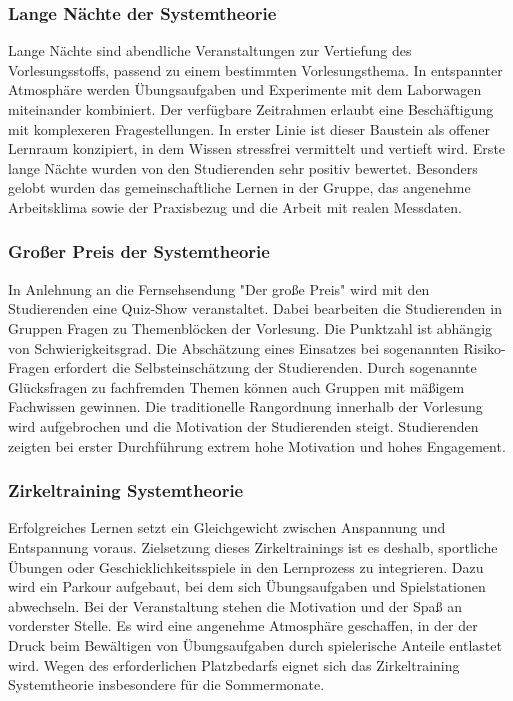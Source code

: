 \subsubsection{Lange Nächte der Systemtheorie}\label{sec:lange-nuxe4chte-der-systemtheorie}

Lange Nächte sind abendliche Veranstaltungen zur Vertiefung des Vorlesungsstoffs, passend zu einem bestimmten Vorlesungsthema. In entspannter Atmosphäre werden Übungsaufgaben und Experimente mit dem Laborwagen miteinander kombiniert. Der verfügbare Zeitrahmen erlaubt eine Beschäftigung mit komplexeren Fragestellungen. In erster Linie ist dieser Baustein als offener Lernraum konzipiert, in dem Wissen stressfrei vermittelt und vertieft wird. Erste lange Nächte wurden von den Studierenden sehr positiv bewertet. Besonders gelobt wurden das gemeinschaftliche Lernen in der Gruppe, das angenehme Arbeitsklima sowie der Praxisbezug und die Arbeit mit realen Messdaten.

\subsubsection{Großer Preis der Systemtheorie}\label{sec:grouxdfer-preis-der-systemtheorie}

In Anlehnung an die Fernsehsendung "Der große Preis" wird mit den Studierenden eine Quiz-Show veranstaltet. Dabei bearbeiten die Studierenden in Gruppen Fragen zu Themenblöcken der Vorlesung. Die Punktzahl ist abhängig von Schwierigkeitsgrad. Die Abschätzung eines Einsatzes bei sogenannten Risiko-Fragen erfordert die Selbsteinschätzung der Studierenden. Durch sogenannte Glücksfragen zu fachfremden Themen können auch Gruppen mit mäßigem Fachwissen gewinnen. Die traditionelle Rangordnung innerhalb der Vorlesung wird aufgebrochen und die Motivation der Studierenden steigt. Studierenden zeigten bei erster Durchführung extrem hohe Motivation und hohes Engagement.

\subsubsection{Zirkeltraining Systemtheorie}\label{sec:zirkeltraining-systemtheorie}

Erfolgreiches Lernen setzt ein Gleichgewicht zwischen Anspannung und Entspannung voraus. Zielsetzung dieses Zirkeltrainings ist es deshalb, sportliche Übungen oder Geschicklichkeitsspiele in den Lernprozess zu integrieren. Dazu wird ein Parkour aufgebaut, bei dem sich Übungsaufgaben und Spielstationen abwechseln. Bei der Veranstaltung stehen die Motivation und der Spaß an vorderster Stelle. Es wird eine angenehme Atmosphäre geschaffen, in der der Druck beim Bewältigen von Übungsaufgaben durch spielerische Anteile entlastet wird. Wegen des erforderlichen Platzbedarfs eignet sich das Zirkeltraining Systemtheorie insbesondere für die Sommermonate.

